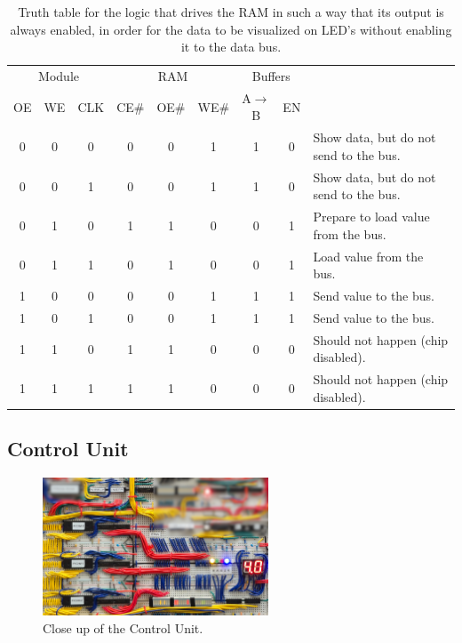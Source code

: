 \begin{table}[H]
  \centering
  \begin{tabular}{ccc|ccc|cc|l}
    \multicolumn{3}{c}{Module} & \multicolumn{3}{c}{RAM} & \multicolumn{2}{c}{Buffers} & \\ 
    OE & WE & CLK & CE\# & OE\# & WE\# & A$\rightarrow$B & EN &  \\ \hline
    0 & 0 & 0    & 0 & 0 & 1 & 1 & 0   & Show data, but do not send to the bus. \\
    0 & 0 & 1    & 0 & 0 & 1 & 1 & 0   & Show data, but do not send to the bus. \\
    0 & 1 & 0    & 1 & 1 & 0 & 0 & 1   & Prepare to load value from the bus. \\
    0 & 1 & 1    & 0 & 1 & 0 & 0 & 1   & Load value from the bus. \\
    1 & 0 & 0    & 0 & 0 & 1 & 1 & 1   & Send value to the bus. \\
    1 & 0 & 1    & 0 & 0 & 1 & 1 & 1   & Send value to the bus. \\
    1 & 1 & 0    & 1 & 1 & 0 & 0 & 0   & Should not happen (chip disabled). \\
    1 & 1 & 1    & 1 & 1 & 0 & 0 & 0   & Should not happen (chip disabled). \\
  \end{tabular}
  
  \caption{Truth table for the logic that drives the RAM in such a way that its output is always enabled, in order for the data to be visualized on LED's without enabling it to the data bus.}
  \label{tab:ramlogic}
\end{table}


\newpage\subsection{Control Unit}\label{sec:implementation:cu}
\begin{figure}[H]
  \centering
  \includegraphics[width=0.6\textwidth]{img/controlunitcloseup}
  \caption{Close up of the Control Unit.}
  \label{fig:controlunitcloseup}
\end{figure}

